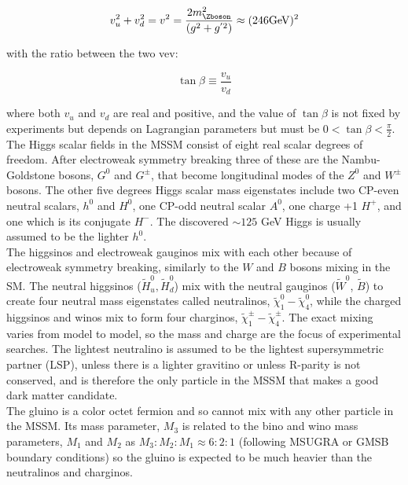 \begin{equation}
v_u^2 + v_d^2 = v^2 = \frac{2m_{\Zboson}^2}{(g^2+g^{'2})} \approx (246 \mathrm{GeV})^2
\end{equation}

with the ratio between the two \gls{vev}:

\begin{equation}
\tan \beta \equiv \frac{v_u}{v_d}
\end{equation}

where both $v_u$ and $v_d$ are real and positive, and the value of $\tan \beta$ is not fixed by experiments but depends on Lagrangian parameters but must be $0 < \tan \beta < \frac{\pi}{2}$.  \\

The Higgs scalar fields in the MSSM consist of eight real scalar degrees of freedom.  After electroweak symmetry breaking three of these are the Nambu-Goldstone bosons, $G^{0}$ and $G^{\pm}$, that become longitudinal modes of the $Z^0$ and $W^{\pm}$ bosons.  The other five degrees Higgs scalar mass eigenstates include two CP-even neutral scalars, $h^0$ and $H^0$, one CP-odd neutral scalar $A^0$, one charge +1 $H^+$, and one which is its conjugate $H^-$. The discovered $\sim 125$ GeV Higgs is usually assumed to be the lighter $h^0$. \\


The higgsinos and electroweak gauginos mix with each other because of electroweak symmetry breaking, similarly to the $W$ and $B$ bosons mixing in the SM.  The neutral higgsinos ($\widetilde{H}^0_u,\widetilde{H}^0_d$)  mix with the neutral gauginos ($\widetilde{W}^0$, $\widetilde{B}$) to create four neutral mass eigenstates called neutralinos, $\widetilde{\chi}^0_1-\widetilde{\chi}^0_4$, while the charged higgsinos and winos mix to form four charginos, $\widetilde{\chi}^\pm_1-\widetilde{\chi}^\pm_4$.  The exact mixing varies from model to model, so the mass and charge are the focus of experimental searches.  The lightest neutralino is assumed to be the lightest supersymmetric partner (LSP), unless there is a lighter gravitino or unless R-parity is not conserved, and is therefore the only particle in the MSSM that makes a good dark matter candidate.  \\


The gluino is a color octet fermion and so cannot mix with any other particle in the MSSM. Its mass parameter, $M_{3}$ is related to the bino and wino mass parameters, $M_{1}$ and $M_{2}$ as $M_{3}:M_{2}:M_{1} \approx 6:2:1$ (following MSUGRA or GMSB boundary conditions) so the gluino is expected to be much heavier than the neutralinos and charginos.  \\

